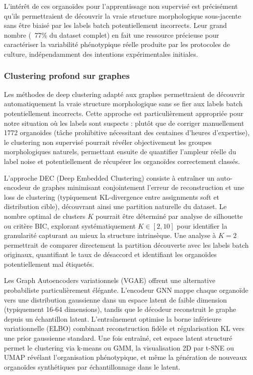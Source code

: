 L'intérêt de ces organoïdes pour l'apprentissage non supervisé est précisément qu'ils permettraient de découvrir la vraie structure morphologique sous-jacente sans être biaisé par les labels batch potentiellement incorrects. Leur grand nombre (~77\% du dataset complet) en fait une ressource précieuse pour caractériser la variabilité phénotypique réelle produite par les protocoles de culture, indépendamment des intentions expérimentales initiales.

\subsubsection{Clustering profond sur graphes}

Les méthodes de deep clustering adapté aux graphes permettraient de découvrir automatiquement la vraie structure morphologique sans se fier aux labels batch potentiellement incorrects. Cette approche est particulièrement appropriée pour notre situation où les labels sont suspects : plutôt que de corriger manuellement 1772 organoïdes (tâche prohibitive nécessitant des centaines d'heures d'expertise), le clustering non supervisé pourrait révéler objectivement les groupes morphologiques naturels, permettant ensuite de quantifier l'ampleur réelle du label noise et potentiellement de récupérer les organoïdes correctement classés.

L'approche DEC (Deep Embedded Clustering) consiste à entraîner un auto-encodeur de graphes minimisant conjointement l'erreur de reconstruction et une loss de clustering (typiquement KL-divergence entre assignments soft et distribution cible), découvrant ainsi une partition naturelle du dataset. Le nombre optimal de clusters $K$ pourrait être déterminé par analyse de silhouette ou critère BIC, explorant systématiquement $K \in [2, 10]$ pour identifier la granularité capturant au mieux la structure intrinsèque. Une analyse à $K=2$ permettrait de comparer directement la partition découverte avec les labels batch originaux, quantifiant le taux de désaccord et identifiant les organoïdes potentiellement mal étiquetés.

Les Graph Autoencoders variationnels (VGAE) offrent une alternative probabiliste particulièrement élégante. L'encodeur GNN mappe chaque organoïde vers une distribution gaussienne dans un espace latent de faible dimension (typiquement 16-64 dimensions), tandis que le décodeur reconstruit le graphe depuis un échantillon latent. L'entraînement optimise la borne inférieure variationnelle (ELBO) combinant reconstruction fidèle et régularisation KL vers une prior gaussienne standard. Une fois entraîné, cet espace latent structuré permet le clustering via k-means ou GMM, la visualisation 2D par t-SNE ou UMAP révélant l'organisation phénotypique, et même la génération de nouveaux organoïdes synthétiques par échantillonnage dans le latent.

